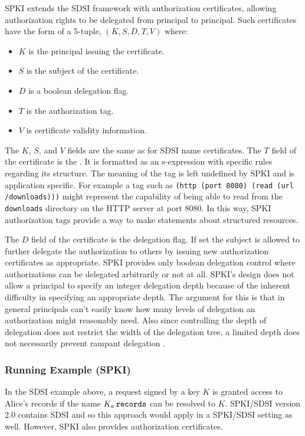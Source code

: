 SPKI extends the SDSI framework with authorization certificates,
allowing authorization rights to be delegated from principal to
principal. Such certificates have the form of a 5-tuple, $(K, S, D, T,
V)$ where:
\begin{itemize}
\item $K$ is the principal issuing the certificate.
\item $S$ is the subject of the certificate.
\item $D$ is a boolean delegation flag.
\item $T$ is the authorization tag.
\item $V$ is certificate validity information.
\end{itemize}
The $K$, $S$, and $V$ fields are the same as for SDSI name
certificates.  The $T$ field of the certificate is the
. It is formatted as an s-expression with
specific rules regarding its structure.  The meaning of the
tag is left undefined by SPKI and is application specific.  For
example a tag such as
\texttt{(http (port 8080) (read (url /downloads)))} might represent the
capability of being able to read from the \texttt{downloads} directory
on the HTTP server at port 8080. In this way, SPKI authorization tags
provide a way to make statements about structured resources.

The $D$ field of the certificate is the delegation flag.  If set the
subject is allowed to further delegate the authorization to others by
issuing new authorization certificates as appropriate. SPKI provides
only boolean delegation control where authorizations can be delegated
arbitrarily or not at all. SPKI's design does not allow a principal to
specify an integer delegation depth because of the inherent difficulty
in specifying an appropriate depth.  The argument for this is that in
general principals can't easily know how many levels of delegation an
authorization might reasonably need. Also since controlling the depth
of delegation does not restrict the width of the delegation tree, a
limited depth does not necessarily prevent rampant delegation
\cite{RFC-2693}.

\subsubsection{Running Example (SPKI)}

In the SDSI example above, a request signed by a key $K$ is granted access
to Alice's records if the name $K_a\, \text{\tt records}$ can be resolved
to $K$. SPKI/SDSI version 2.0 contains SDSI and so this approach would
apply in a SPKI/SDSI setting as well. However, SPKI also provides
authorization certificates.

